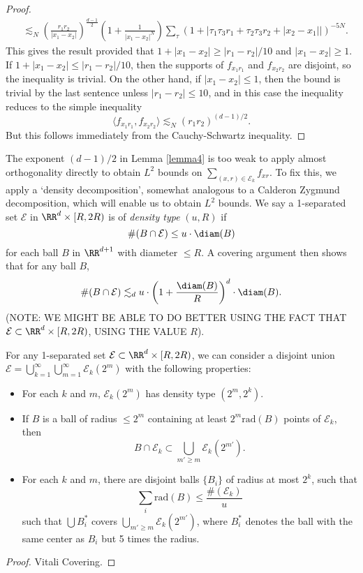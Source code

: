 \begin{proof}
\begin{align*}
        &\lesssim_N \left( \frac{r_1r_2}{|x_1 - x_2|} \right)^{\frac{d-1}{2}} \left(1 + \frac{1}{|x_1 - x_2|^N} \right) \sum_\tau \left( 1 + |\tau_1 \tau_3 r_1 + \tau_2 \tau_3 r_2 + |x_2 - x_1|| \right)^{-5N}.
    \end{align*}
    This gives the result provided that $1 + |x_1 - x_2| \geq |r_1 - r_2| / 10$ and $|x_1 - x_2| \geq 1$. If $1 + |x_1 - x_2| \leq |r_1 - r_2| / 10$, then the supports of $f_{x_1r_1}$ and $f_{x_2r_2}$ are disjoint, so the inequality is trivial. On the other hand, if $|x_1 - x_2| \leq 1$, then the bound is trivial by the last sentence unless $|r_1 - r_2| \leq 10$, and in this case the inequality reduces to the simple inequality
    \[ \langle f_{x_1r_1}, f_{x_2r_2} \rangle \lesssim_N (r_1 r_2)^{(d-1)/2}. \] 
    But this follows immediately from the Cauchy-Schwartz inequality.
\end{proof}

The exponent $(d-1)/2$ in Lemma \ref{lemma4} is too weak to apply almost orthogonality directly to obtain $L^2$ bounds on $\sum_{(x,r) \in \mathcal{E}_k} f_{xr}$. To fix this, we apply a `density decomposition', somewhat analogous to a Calderon Zygmund decomposition, which will enable us to obtain $L^2$ bounds. We say a 1-separated set $\mathcal{E}$ in $\RR^d \times [R,2R)$ is of \emph{density type} $(u,R)$ if
%
\[ \#(B \cap \mathcal{E}) \leq u \cdot \diam(B) \]
%
for each ball $B$ in $\RR^{d+1}$ with diameter $\leq R$. A covering argument then shows that for any ball $B$,
%
\[ \#(B \cap \mathcal{E}) \lesssim_d u \cdot \left( 1 + \frac{\diam(B)}{R} \right)^d \cdot \diam(B). \]
%
(NOTE: WE MIGHT BE ABLE TO DO BETTER USING THE FACT THAT $\mathcal{E} \subset \RR^d \times [R,2R)$, USING THE VALUE $R$).

\begin{theorem} \label{DecompositionTheorem}
    For any 1-separated set $\mathcal{E} \subset \RR^d \times [R,2R)$, we can consider a disjoint union $\mathcal{E} = \bigcup_{k = 1}^\infty \bigcup_{m = 1}^\infty \mathcal{E}_k(2^m)$ with the following properties:
    \begin{itemize}
        \item For each $k$ and $m$, $\mathcal{E}_k(2^m)$ has density type $(2^m,2^k)$.
        \item If $B$ is a ball of radius $\leq 2^m$ containing at least $2^m \text{rad}(B)$ points of $\mathcal{E}_k$, then
        \[ B \cap \mathcal{E}_k \subset \bigcup_{m' \geq m} \mathcal{E}_k(2^{m'}). \]
        \item For each $k$ and $m$, there are disjoint balls $\{ B_i \}$ of radius at most $2^k$, such that
        \[ \sum_i \text{rad}(B) \leq \frac{\#(\mathcal{E}_k)}{u} \]
        such that $\bigcup B_i^*$ covers $\bigcup_{m' \geq m} \mathcal{E}_k(2^{m'})$, where $B_i^*$ denotes the ball with the same center as $B_i$ but 5 times the radius.
    \end{itemize}
\end{theorem}
\begin{proof}
    Vitali Covering.
\end{proof}

